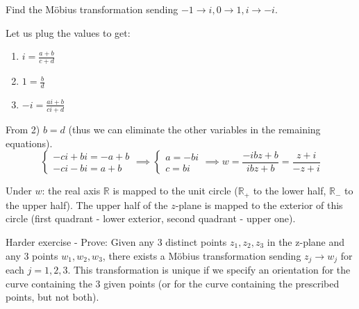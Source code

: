 \begin{example} \label{example:16.5} Find the Möbius transformation sending $-1 \to i, 0 \to 1, i \to -i$.
    \begin{soln}
         Let us plug the values to get:
\begin{enumerate}
    \item $i = \frac{a+b}{c+d}$
    \item $1 = \frac{b}{d}$
    \item $-i = \frac{ai+b}{ci+d}$
\end{enumerate}

From 2) $b = d$ (thus we can eliminate the other variables in the remaining equations).
\[ \begin{cases}
-ci + bi = -a + b \\
-ci - bi = a + b
\end{cases}
\implies
\begin{cases}
a = -bi \\
c = bi
\end{cases}
\implies w = \frac{-ibz + b}{ibz + b} = \frac{z+i}{-z+i} \]
\end{soln}
\end{example}

\checkthis{} Under $w$: the real axis $\mathbb{R}$ is mapped to the unit circle ($\mathbb{R}_+$ to the lower half, $\mathbb{R}_-$ to the upper half). The upper half of the $z$-plane is mapped to the exterior of this circle (first quadrant - lower exterior, second quadrant - upper one).

Harder exercise - Prove: Given any 3 distinct points $z_1, z_2, z_3$ in the z-plane and any 3 points $w_1, w_2, w_3$, there exists a Möbius transformation sending $z_j \to w_j$ for each $j = 1, 2, 3$. This transformation is unique if we specify an orientation for the curve containing the 3 given points (or for the curve containing the prescribed points, but not both).

